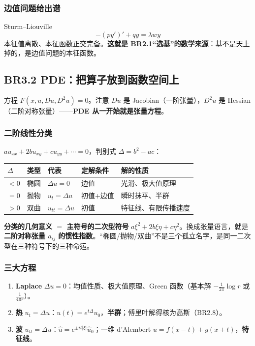 \subsubsection{边值问题给出谱}

Sturm--Liouville
\[
-(py')'+qy=\lambda wy
\]
本征值离散、本征函数正交完备。\textbf{这就是 BR2.1“选基”的数学来源}：基不是天上掉的，是边值问题的本征函数。

\subsection{BR3.2 PDE：把算子放到函数空间上}

方程 $F(x,u,Du,D^2u)=0$。注意 $Du$ 是 Jacobian（一阶张量），$D^2u$ 是 Hessian（二阶对称张量）——\textbf{PDE 从一开始就是张量方程}。

\subsubsection{二阶线性分类}

$au_{xx}+2bu_{xy}+cu_{yy}+\cdots=0$，判别式 $\Delta=b^2-ac$：

\begin{center}
\begin{tabular}{L{1.6cm}L{2.2cm}L{3.2cm}L{2.6cm}L{3.4cm}}
\toprule
$\Delta$ & 类型 & 代表 & 定解条件 & 解的性质 \\
\midrule
$<0$ & 椭圆 & $\Delta u=0$ & 边值 & 光滑、极大值原理 \\
$=0$ & 抛物 & $u_t=\Delta u$ & 初值+边值 & 瞬时抹平、半群 \\
$>0$ & 双曲 & $u_{tt}=\Delta u$ & 初值 & 特征线、有限传播速度 \\
\bottomrule
\end{tabular}
\end{center}

\textbf{分类的几何意义 $=$ 主符号的二次型符号} $a\xi^2+2b\xi\eta+c\eta^2$。换成张量语言，就是\textbf{二阶对称张量 $a_{ij}$ 的惯性指数}。“椭圆/抛物/双曲”不是三个孤立名字，是同一二次型在三种符号下的三种命运。

\subsubsection{三大方程}

\begin{enumerate}
  \item \textbf{Laplace} $\Delta u=0$：均值性质、极大值原理、Green 函数（基本解 $-\frac{1}{2\pi}\log r$ 或 $\frac{1}{4\pi r}$）。
  \item \textbf{热} $u_t=\Delta u$：$u(t)=e^{t\Delta}u_0$，\textbf{半群}；傅里叶解得核为高斯（BR2.8）。
  \item \textbf{波} $u_{tt}=\Delta u$：$\hat u=e^{\pm it|\xi|}\hat u_0$；一维 d'Alembert $u=f(x-t)+g(x+t)$，\textbf{特征线}。
\end{enumerate}

